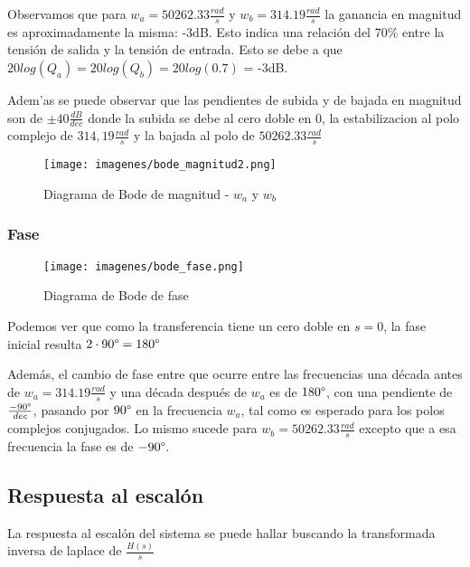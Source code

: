 \documentclass[12pt, titlepage]{article}
\begin{document}
    Observamos que para $w_a =  50262.33\frac{rad}{s}$ y $w_b =  314.19\frac{rad}{s}$ la ganancia en magnitud es aproximadamente la misma: -3dB. Esto indica una relación del 70\% entre la tensión de salida y la tensión de entrada. Esto se debe a que $20log(Q_a) = 20log(Q_b) = 20log(0.7)$ = -3dB.
    
    Adem'as se puede observar que las pendientes de subida y de bajada en magnitud son de $\pm40\frac{dB}{dec}$ donde la subida se debe al cero doble en 0, la estabilizacion al polo complejo de $314,19\frac{rad}{s}$ y la bajada al polo de $50262.33\frac{rad}{s}$
    \begin{figure}[!htb]
     \texttt{[image: imagenes/bode\_magnitud2.png]}
     \centering
     \caption{Diagrama de Bode de magnitud - $w_a$ y $w_b$}
    \end{figure}
    
    \newpage
    
    \subsubsection{Fase}
    \begin{figure}[!htb]
     \texttt{[image: imagenes/bode\_fase.png]}
     \centering
     \caption{Diagrama de Bode de fase}
    \end{figure}
    
    Podemos ver que como la transferencia tiene un cero doble en $s=0$, la fase inicial resulta $2 \cdot90\degree = 180\degree$
    
    Además, el cambio de fase entre que ocurre entre las frecuencias una década antes de $w_{a} = 314.19\frac{rad}{s}$ y una década después de $w_{a}$ es de $180\degree$, con una pendiente de $\frac{-90\degree}{dec}$, pasando por $90\degree$ en la frecuencia $w_a$, tal como es esperado para los polos complejos conjugados. Lo mismo sucede para $w_b = 50262.33\frac{rad}{s}$ excepto que a esa frecuencia la fase es de $-90\degree$.
    
    \subsection{Respuesta al escalón}
    La respuesta al escalón del sistema se puede hallar buscando la transformada inversa de laplace de $\frac{H(s)}{s}$
    
\end{document}
